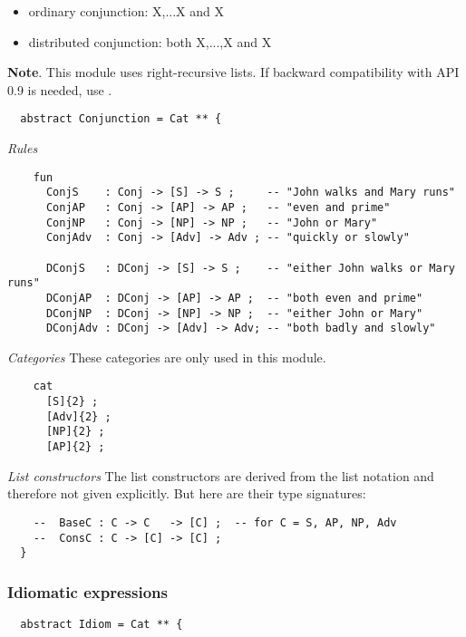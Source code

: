 \documentclass[11pt,a4paper]{article}
\newcommand{\commOut}[1]{}
\newcommand{\subsubsubsection}[1]{\textit{#1}}
\begin{document}
\begin{itemize}
\item ordinary conjunction: X,...X and X
\item distributed conjunction: both X,...,X and X
\end{itemize}

\textbf{Note}. This module uses right-recursive lists. If backward
compatibility with API 0.9 is needed, use
.

\begin{verbatim}
  abstract Conjunction = Cat ** {
\end{verbatim}

\subsubsubsection{Rules}
\begin{verbatim}
    fun
      ConjS    : Conj -> [S] -> S ;     -- "John walks and Mary runs"
      ConjAP   : Conj -> [AP] -> AP ;   -- "even and prime"
      ConjNP   : Conj -> [NP] -> NP ;   -- "John or Mary"
      ConjAdv  : Conj -> [Adv] -> Adv ; -- "quickly or slowly"
  
      DConjS   : DConj -> [S] -> S ;    -- "either John walks or Mary runs"
      DConjAP  : DConj -> [AP] -> AP ;  -- "both even and prime"
      DConjNP  : DConj -> [NP] -> NP ;  -- "either John or Mary"
      DConjAdv : DConj -> [Adv] -> Adv; -- "both badly and slowly"
\end{verbatim}

\subsubsubsection{Categories}
These categories are only used in this module.

\begin{verbatim}
    cat
      [S]{2} ; 
      [Adv]{2} ; 
      [NP]{2} ; 
      [AP]{2} ;
\end{verbatim}

\subsubsubsection{List constructors}
The list constructors are derived from the list notation and therefore
not given explicitly. But here are their type signatures:

\begin{verbatim}
    --  BaseC : C -> C   -> [C] ;  -- for C = S, AP, NP, Adv
    --  ConsC : C -> [C] -> [C] ;
  }
\end{verbatim}

\commOut{Produced by 
gfdoc - a rudimentary GF document generator.
(c) Aarne Ranta (\htmladdnormallink{aarne@cs.chalmers.se}{mailto:aarne@cs.chalmers.se}) 2002 under GNU GPL.}


\subsubsection{Idiomatic expressions}
\begin{verbatim}
  abstract Idiom = Cat ** {
\end{verbatim}
\end{document}
